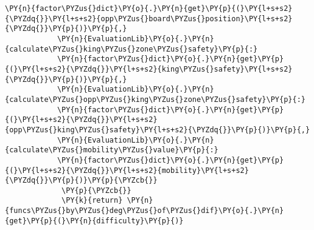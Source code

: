 \begin{Verbatim}[commandchars=\\\{\}]
			\PY{n}{factor\PYZus{}dict}\PY{o}{.}\PY{n}{get}\PY{p}{(}\PY{l+s+s2}{\PYZdq{}}\PY{l+s+s2}{opp\PYZus{}board\PYZus{}position}\PY{l+s+s2}{\PYZdq{}}\PY{p}{)}\PY{p}{,} 
			\PY{n}{EvaluationLib}\PY{o}{.}\PY{n}{calculate\PYZus{}king\PYZus{}zone\PYZus{}safety}\PY{p}{:} 
			\PY{n}{factor\PYZus{}dict}\PY{o}{.}\PY{n}{get}\PY{p}{(}\PY{l+s+s2}{\PYZdq{}}\PY{l+s+s2}{king\PYZus{}safety}\PY{l+s+s2}{\PYZdq{}}\PY{p}{)}\PY{p}{,} 
			\PY{n}{EvaluationLib}\PY{o}{.}\PY{n}{calculate\PYZus{}opp\PYZus{}king\PYZus{}zone\PYZus{}safety}\PY{p}{:} 
			\PY{n}{factor\PYZus{}dict}\PY{o}{.}\PY{n}{get}\PY{p}{(}\PY{l+s+s2}{\PYZdq{}}\PY{l+s+s2}{opp\PYZus{}king\PYZus{}safety}\PY{l+s+s2}{\PYZdq{}}\PY{p}{)}\PY{p}{,} 
			\PY{n}{EvaluationLib}\PY{o}{.}\PY{n}{calculate\PYZus{}mobility\PYZus{}value}\PY{p}{:} 
			\PY{n}{factor\PYZus{}dict}\PY{o}{.}\PY{n}{get}\PY{p}{(}\PY{l+s+s2}{\PYZdq{}}\PY{l+s+s2}{mobility}\PY{l+s+s2}{\PYZdq{}}\PY{p}{)}\PY{p}{\PYZcb{}}
             \PY{p}{\PYZcb{}}
             \PY{k}{return} \PY{n}{funcs\PYZus{}by\PYZus{}deg\PYZus{}of\PYZus{}dif}\PY{o}{.}\PY{n}{get}\PY{p}{(}\PY{n}{difficulty}\PY{p}{)}
         

\end{Verbatim}
